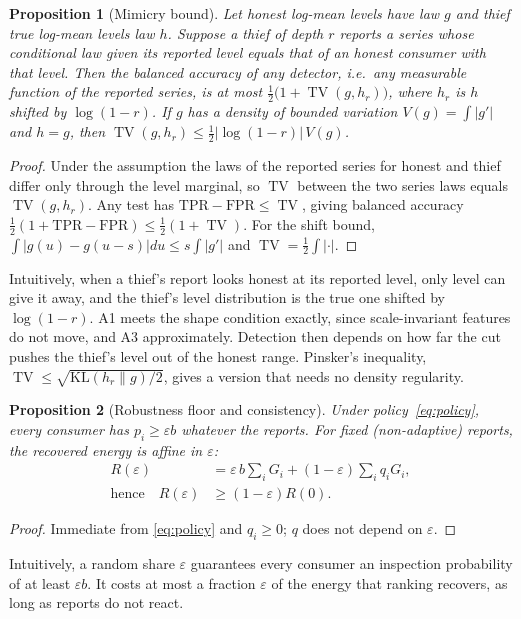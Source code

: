 \documentclass[journal]{IEEEtran}
\newtheorem{proposition}{Proposition}
\DeclareMathOperator{\TV}{TV}
\begin{document}
\begin{proposition}[Mimicry bound]\label{prop:mimic}
Let honest log-mean levels have law $g$ and thief true log-mean levels law $h$. Suppose a thief of depth $r$ reports a series whose conditional law given its reported level equals that of an honest consumer with that level. Then the balanced accuracy of any detector, i.e.\ any measurable function of the reported series, is at most $\tfrac12\big(1+\TV(g,h_r)\big)$, where $h_r$ is $h$ shifted by $\log(1-r)$. If $g$ has a density of bounded variation $V(g)=\int|g'|$ and $h=g$, then $\TV(g,h_r)\le \tfrac12|\log(1-r)|\,V(g)$.
\end{proposition}
\begin{proof}
Under the assumption the laws of the reported series for honest and thief differ only through the level marginal, so $\TV$ between the two series laws equals $\TV(g,h_r)$. Any test has $\mathrm{TPR}-\mathrm{FPR}\le\TV$, giving balanced accuracy $\tfrac12(1+\mathrm{TPR}-\mathrm{FPR})\le\tfrac12(1+\TV)$. For the shift bound, $\int|g(u)-g(u-s)|du\le s\int|g'|$ and $\TV=\tfrac12\int|\cdot|$.
\end{proof}
Intuitively, when a thief's report looks honest at its reported level, only level can give it away, and the thief's level distribution is the true one shifted by $\log(1-r)$. A1 meets the shape condition exactly, since scale-invariant features do not move, and A3 approximately. Detection then depends on how far the cut pushes the thief's level out of the honest range. Pinsker's inequality, $\TV\le\sqrt{\mathrm{KL}(h_r\|g)/2}$, gives a version that needs no density regularity.

\begin{proposition}[Robustness floor and consistency]\label{prop:floor}
Under policy~\eqref{eq:policy}, every consumer has $p_i\ge\varepsilon b$ whatever the reports. For fixed (non-adaptive) reports, the recovered energy is affine in $\varepsilon$:
\begin{align*}
R(\varepsilon)&=\varepsilon\, b\sum_i G_i + (1-\varepsilon)\sum_i q_iG_i,\\
\text{hence}\quad R(\varepsilon)&\ge(1-\varepsilon)R(0).
\end{align*}
\end{proposition}
\begin{proof}
Immediate from \eqref{eq:policy} and $q_i\ge0$; $q$ does not depend on $\varepsilon$.
\end{proof}
Intuitively, a random share $\varepsilon$ guarantees every consumer an inspection probability of at least $\varepsilon b$. It costs at most a fraction $\varepsilon$ of the energy that ranking recovers, as long as reports do not react.
\end{document}
